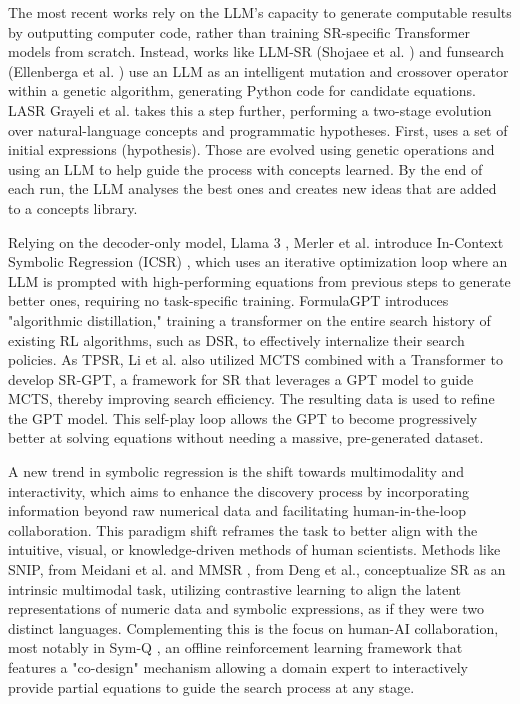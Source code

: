 The most recent works rely on the LLM's capacity to generate computable results by outputting computer code, rather than training SR-specific Transformer models from scratch. Instead, works like LLM-SR (Shojaee et al. \cite{shojaee_llm-sr_2024}) and funsearch (Ellenberga et al. \cite{ellenberg_generative_2025}) use an LLM as an intelligent mutation and crossover operator within a genetic algorithm, generating Python code for candidate equations. LASR Grayeli et al. \cite{grayeli2024symbolicregressionlearnedconcept} takes this a step further, performing a two-stage evolution over natural-language concepts and programmatic hypotheses. First, uses a set of initial expressions (hypothesis). Those are evolved using genetic operations and using an LLM to help guide the process with concepts learned. By the end of each run, the LLM analyses the best ones and creates new ideas that are added to a concepts library.  

Relying on the decoder-only model, Llama 3 \cite{grattafiori2024llama3herdmodels}, Merler et al. introduce In-Context Symbolic Regression (ICSR) \cite{merler_-context_2024}, which uses an iterative optimization loop where an LLM is prompted with high-performing equations from previous steps to generate better ones, requiring no task-specific training. FormulaGPT \cite{li_generative_2024} introduces "algorithmic distillation," training a transformer on the entire search history of existing RL algorithms, such as DSR, to effectively internalize their search policies. As TPSR, Li et al. \cite{li_discovering_2024} also utilized MCTS combined with a Transformer to develop SR-GPT, a framework for SR that leverages a GPT model to guide MCTS, thereby improving search efficiency. The resulting data is used to refine the GPT model. This self-play loop allows the GPT to become progressively better at solving equations without needing a massive, pre-generated dataset.

A new trend in symbolic regression is the shift towards multimodality and interactivity, which aims to enhance the discovery process by incorporating information beyond raw numerical data and facilitating human-in-the-loop collaboration. This paradigm shift reframes the task to better align with the intuitive, visual, or knowledge-driven methods of human scientists. Methods like SNIP, from Meidani et al. \cite{meidani_snip_2023} and MMSR \cite{li_mmsr_2024}, from Deng et al., conceptualize SR as an intrinsic multimodal task, utilizing contrastive learning to align the latent representations of numeric data and symbolic expressions, as if they were two distinct languages. Complementing this is the focus on human-AI collaboration, most notably in Sym-Q \cite{tian_interactive_2025}, an offline reinforcement learning framework that features a "co-design" mechanism allowing a domain expert to interactively provide partial equations to guide the search process at any stage.



